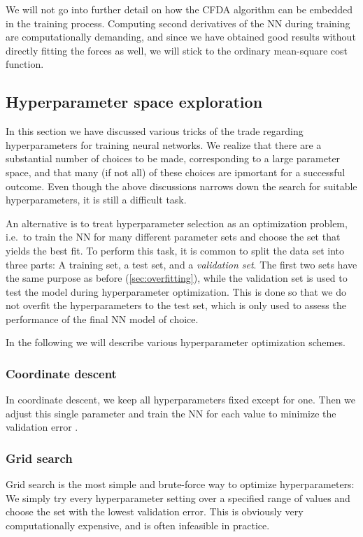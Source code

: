 \documentclass[twoside,english]{uiofysmaster}
\begin{document}
We will not go into further detail on how the CFDA algorithm can be embedded in the training process. 
Computing second derivatives of the NN during training are computationally demanding, and since we have obtained 
good results without directly fitting the forces as well, we will stick to the ordinary mean-square cost function. 



\subsection{Hyperparameter space exploration} \label{sec:optimizingHyperparameters}
In this section we have discussed various tricks of the trade regarding hyperparameters for training neural networks. 
We realize that there are a substantial number of choices to be made, corresponding to a large parameter space, and 
that many (if not all) of these choices are ipmortant for a successful outcome. Even though the above discussions narrows down the search 
for suitable hyperparameters, it is still a difficult task. 

An alternative is to treat hyperparameter selection as an optimization problem, i.e.\ to train the NN for many different 
parameter sets and choose the set that yields the best fit. To perform this task, it is common to split the data set 
into three parts: A training set, a test set, and a \textit{validation set}. The first two sets have the same 
purpose as before (\autoref{sec:overfitting}), while the validation set is used to test the model during hyperparameter 
optimization. This is done so that we do not overfit the hyperparameters to the test set, which is only used to assess 
the performance of the final NN model of choice.

In the following we will describe various hyperparameter optimization schemes. 

\subsubsection{Coordinate descent}
In coordinate descent, we keep all hyperparameters fixed except for one. Then we adjust this single parameter and train the NN
for each value to minimize the validation error  .

\subsubsection{Grid search}
Grid search is the most simple and brute-force way to optimize hyperparameters: We simply try every hyperparameter setting 
over a specified range of values and choose the set with the lowest validation error. This is obviously very computationally 
expensive, and is often infeasible in practice. 
\end{document}
